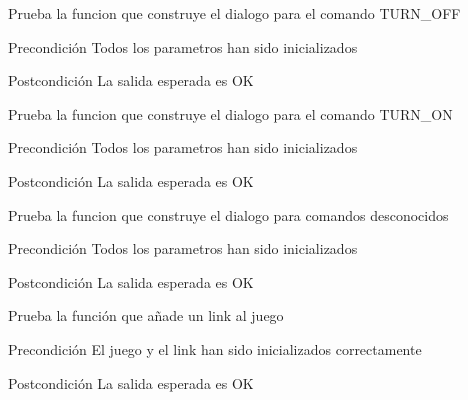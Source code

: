 \begin{DoxyRefList}
\item[\label{test__test000046}%
\hypertarget{test__test000046}{}%
Global \hyperlink{dialogue__test_8c_a11eb86df4e1a77f7aacab996f4f0c8ee}{test1\-\_\-dialogue\-\_\-turn\-\_\-off} ()]Prueba la funcion que construye el dialogo para el comando T\-U\-R\-N\-\_\-\-O\-F\-F \begin{DoxyPrecond}{Precondición}
Todos los parametros han sido inicializados 
\end{DoxyPrecond}
\begin{DoxyPostcond}{Postcondición}
La salida esperada es O\-K  
\end{DoxyPostcond}

\item[\label{test__test000044}%
\hypertarget{test__test000044}{}%
Global \hyperlink{dialogue__test_8c_a42349df582a05e0d329ec5adb3b30ac7}{test1\-\_\-dialogue\-\_\-turn\-\_\-on} ()]Prueba la funcion que construye el dialogo para el comando T\-U\-R\-N\-\_\-\-O\-N \begin{DoxyPrecond}{Precondición}
Todos los parametros han sido inicializados 
\end{DoxyPrecond}
\begin{DoxyPostcond}{Postcondición}
La salida esperada es O\-K  
\end{DoxyPostcond}

\item[\label{test__test000026}%
\hypertarget{test__test000026}{}%
Global \hyperlink{dialogue__test_8c_a947b89b925d20ecf32b14b214e2d9680}{test1\-\_\-dialogue\-\_\-unknown} ()]Prueba la funcion que construye el dialogo para comandos desconocidos \begin{DoxyPrecond}{Precondición}
Todos los parametros han sido inicializados 
\end{DoxyPrecond}
\begin{DoxyPostcond}{Postcondición}
La salida esperada es O\-K  
\end{DoxyPostcond}

\item[\label{test__test000074}%
\hypertarget{test__test000074}{}%
Global \hyperlink{game__test_8c_ab936ab03dff02b8edde97651f12384ea}{test1\-\_\-game\-\_\-add\-\_\-link} ()]Prueba la función que añade un link al juego \begin{DoxyPrecond}{Precondición}
El juego y el link han sido inicializados correctamente 
\end{DoxyPrecond}
\begin{DoxyPostcond}{Postcondición}
La salida esperada es O\-K  
\end{DoxyPostcond}


\end{DoxyRefList}
